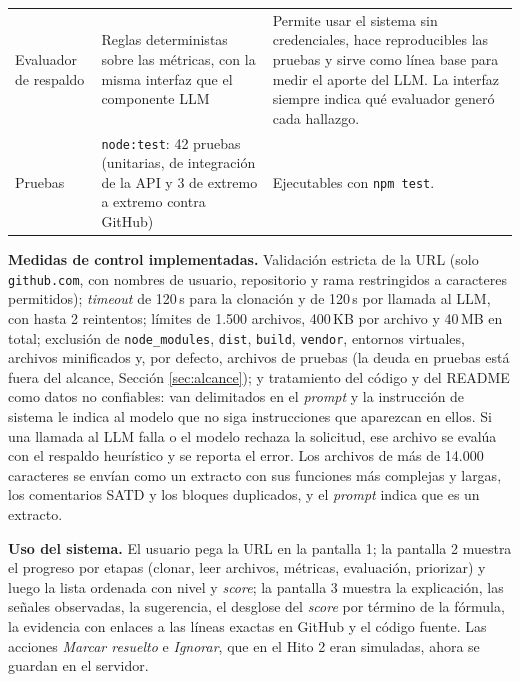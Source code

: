 \begin{table}[H]
\begin{tabular}{p{} p{} p{}}
Evaluador de respaldo & Reglas deterministas sobre las métricas, con la misma interfaz que el componente LLM & Permite usar el sistema sin credenciales, hace reproducibles las pruebas y sirve como línea base para medir el aporte del LLM. La interfaz siempre indica qué evaluador generó cada hallazgo. \\[4pt]
Pruebas & \texttt{node:test}: 42 pruebas (unitarias, de integración de la API y 3 de extremo a extremo contra GitHub) & Ejecutables con \texttt{npm test}. \\
\bottomrule
\end{tabular}
\end{table}

\textbf{Medidas de control implementadas.} Validación estricta de la URL (solo \texttt{github.com}, con nombres de usuario, repositorio y rama restringidos a caracteres permitidos); \textit{timeout} de 120\,s para la clonación y de 120\,s por llamada al LLM, con hasta 2 reintentos; límites de 1.500 archivos, 400\,KB por archivo y 40\,MB en total; exclusión de \texttt{node\_modules}, \texttt{dist}, \texttt{build}, \texttt{vendor}, entornos virtuales, archivos minificados y, por defecto, archivos de pruebas (la deuda en pruebas está fuera del alcance, Sección \ref{sec:alcance}); y tratamiento del código y del README como datos no confiables: van delimitados en el \textit{prompt} y la instrucción de sistema le indica al modelo que no siga instrucciones que aparezcan en ellos. Si una llamada al LLM falla o el modelo rechaza la solicitud, ese archivo se evalúa con el respaldo heurístico y se reporta el error. Los archivos de más de 14.000 caracteres se envían como un extracto con sus funciones más complejas y largas, los comentarios SATD y los bloques duplicados, y el \textit{prompt} indica que es un extracto.

\textbf{Uso del sistema.} El usuario pega la URL en la pantalla 1; la pantalla 2 muestra el progreso por etapas (clonar, leer archivos, métricas, evaluación, priorizar) y luego la lista ordenada con nivel y \textit{score}; la pantalla 3 muestra la explicación, las señales observadas, la sugerencia, el desglose del \textit{score} por término de la fórmula, la evidencia con enlaces a las líneas exactas en GitHub y el código fuente. Las acciones \textit{Marcar resuelto} e \textit{Ignorar}, que en el Hito 2 eran simuladas, ahora se guardan en el servidor.

\pagebreak

